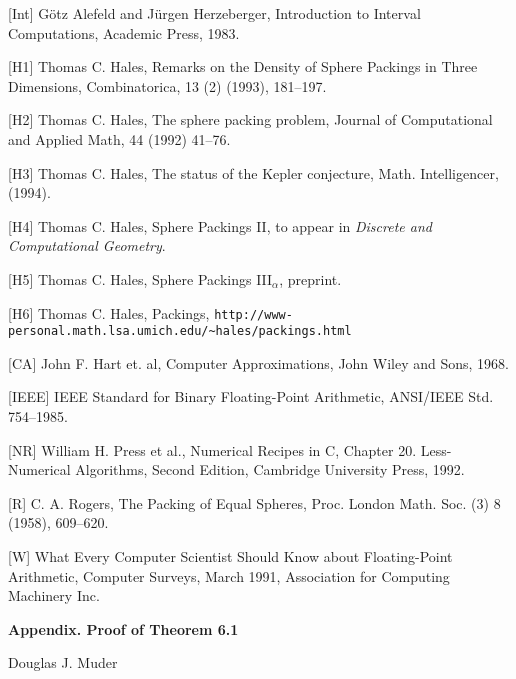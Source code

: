 [Int] G\"otz Alefeld and J\"urgen Herzeberger, Introduction to
        Interval Computations, Academic Press, 1983.

[H1] Thomas C. Hales, Remarks on the Density of Sphere Packings
        in Three Dimensions, Combinatorica, 13 (2) (1993), 181--197.

[H2] Thomas C. Hales, The sphere packing problem, Journal of Computational
and Applied Math, 44 (1992) 41--76.

[H3] Thomas C. Hales, The status of the Kepler conjecture, 
	Math. Intelligencer, (1994).

[H4] Thomas C. Hales, Sphere Packings II, to appear in 
	{\it Discrete and Computational Geometry}.

[H5] Thomas C. Hales, Sphere Packings III$_\alpha$, preprint.

[H6] Thomas C. Hales, Packings,\hfill\break\quad
{\tt http://www-personal.math.lsa.umich.edu/\~\relax hales/packings.html}


[CA] John F. Hart et. al, Computer Approximations, John Wiley
and Sons, 1968.

[IEEE]  IEEE Standard for Binary Floating-Point Arithmetic, ANSI/IEEE
                Std. 754--1985.

[NR] William H. Press et al., Numerical Recipes in C,
        Chapter 20. Less-Numerical Algorithms, Second Edition,
        Cambridge University Press, 1992.

[R] C. A. Rogers, The Packing of Equal Spheres, Proc. London Math. Soc.
        (3) 8 (1958), 609--620.

[W] What Every Computer Scientist Should Know about Floating-Point
        Arithmetic, Computer Surveys, March 1991, Association for
        Computing Machinery Inc.


\endRefs


\vfill\eject

\centerline{\bf Appendix.  Proof of Theorem 6.1}
\medskip
\centerline{Douglas J. Muder}
\bigskip



